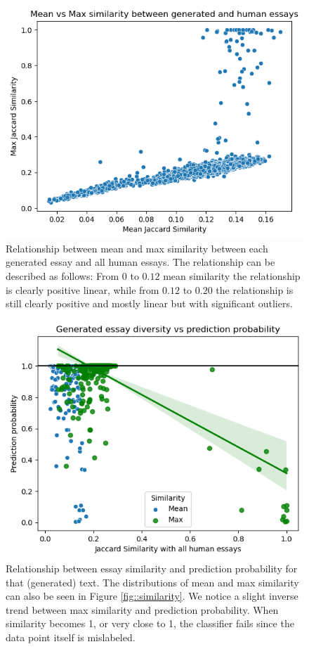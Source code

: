 \documentclass[11pt, a4paper]{article}
\begin{document}
	\begin{figure}
		\includegraphics[width=14cm]{similarity_mean_max.png}
		\centering
		\caption{Relationship between mean and max similarity between each generated essay and all human essays. The relationship can be described as follows: From $0$ to $0.12$ mean similarity the relationship is clearly positive linear, while from $0.12$ to $0.20$ the relationship is still clearly positive and mostly linear but with significant outliers.}
		\label{fig::similarity_mean_max}
	\end{figure}
	
	\begin{figure}
		\includegraphics[width=14cm]{diversity_plot.png}
		\centering
		\caption{Relationship between essay similarity and prediction probability for that (generated) text. The distributions of mean and max similarity can also be seen in Figure \ref{fig::similarity}. We notice a slight inverse trend between max similarity and prediction probability. When similarity becomes 1, or very close to 1, the classifier fails since the data point itself is mislabeled.}
		\label{fig::diversity_plot}
	\end{figure}
	
\end{document}
